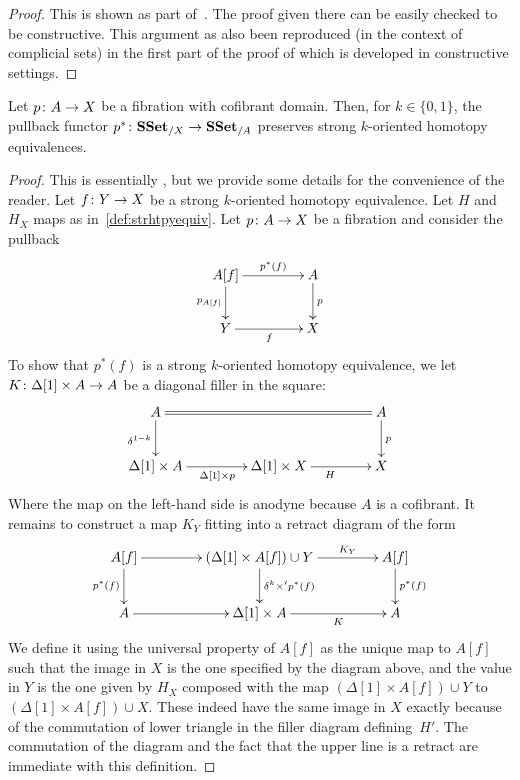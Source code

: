 \documentclass[reqno,10pt,a4paper,oneside,draft]{amsart}
\begin{document}
\begin{proof}
This is shown as part of~\cite[Theorem 3.2.3]{joyal-tierney:simplicial-homotopy-theory}. The proof given there can be easily checked to be constructive. This argument as also been reproduced (in the context of complicial sets) in the first part of the proof of \cite[Proposition~5.2.6]{henry2018wms} which is developed in constructive settings.
\end{proof}




\begin{lemma} 
\label{lemma:pb_of_StrongHomotopyEq}
Let $p \colon A \rightarrow X$ be a fibration with cofibrant domain. Then, for $k \in \{0,1\}$, 
the pullback functor $p^* \colon \mathbf{SSet}_{/X} \to \mathbf{SSet}_{/A}$ preserves strong $k$-oriented homotopy equivalences.
\end{lemma}



\begin{proof} This is essentially \cite[Lemma~3.7]{gambino2017frobenius}, but we provide some details
for the convenience of the reader.
Let $f \colon Y \rightarrow X$ be a strong $k$-oriented homotopy equivalence. Let $H$ and $H_X$  maps 
as in~\cref{def:strhtpyequiv}. Let $p \colon A \rightarrow X$ be a fibration and consider the pullback
\[
\xymatrix@C=1.5cm{
A[f] \ar[r]^-{p^*(f)}  \ar[d]_{p_{A[f]}} & A \ar[d]^{p} \\
Y \ar[r]_{f} & X \\
}
\] 
To show that $p^*(f)$ is a strong $k$-oriented homotopy equivalence, we let $K \colon \Delta[1] \times A \rightarrow A$ be a diagonal filler in the square:
\[
\xymatrix@C=1.5cm{
A \ar[d]_{\delta^{1-k}} \ar@{=}[rr] & & A \ar[d]^p \\ 
\Delta[1] \times A \ar[r]_{\Delta[1] \times p}  & \Delta[1] \times X \ar[r]_H & X
}\]
Where the map on the left-hand side is anodyne because $A$ is a cofibrant.
It remains to construct a map $K_Y$  fitting into a retract diagram of the form
\[
\xymatrix@C=1.5cm{
A[f]  \ar[d]_{p^*(f)} \ar[r] &  (\Delta[1] \times A[f])  \cup Y \ar[d]^{\delta^k \times' p^*(f)} \ar[r]^-{K_Y} & A[f] \ar[d]^{p^*(f)} \\
A \ar[r] & \Delta[1]  \times A \ar[r]_-{K} & A
}
\]
We define it using the universal property of $A[f]$ as the unique map to $A[f]$ such that the image in $X$ is the one specified by the diagram above, and the value in $Y$ is the one given by $H_X$ composed with the map $(\Delta[1] \times A[f]) \cup Y$ to $(\Delta[1] \times A[f]) \cup X$. These indeed have the same image in $X$ exactly because of the commutation of lower triangle in the filler diagram defining~$H'$. The commutation of the diagram and the fact that the upper line is a retract are immediate with this definition.
\end{proof}
\end{document}
